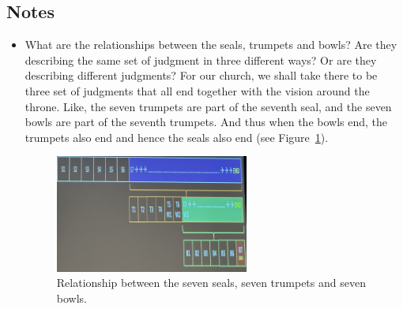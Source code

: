 \subsection*{Notes}
\begin{itemize}
  \item{What are the relationships between the seals, trumpets and bowls?
  Are they describing the same set of judgment in three different ways?  Or
  are they describing different judgments?  For our church, we shall take
  there to be three set of judgments that all end together with the vision
  around the throne.  Like, the seven trumpets are part of the seventh seal,
  and the seven bowls are part of the seventh trumpets.  And thus when the
  bowls end, the trumpets also end and hence the seals also end (see Figure~\ref{fig: r/s between seals, trumpets and bowls}). 
  
  \begin{figure}[H]
    \centering
    \includegraphics[width=0.6\textwidth, trim={0cm 0cm 0cm 0cm},clip]{Figures/febSermon4Fig1}
    \caption[]{Relationship between the seven seals, seven trumpets and seven bowls.}
    \label{fig: r/s between seals, trumpets and bowls}
  \end{figure}
  
  }


\end{itemize}
